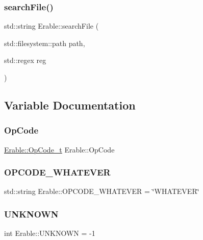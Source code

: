 \mbox{\label{namespace_erable_ab8dc07f5bbd7c2e716b38c2feaca831b}} 
\subsubsection{\texorpdfstring{searchFile()}{searchFile()}}
{\footnotesize\ttfamily std\+::string Erable\+::search\+File (\begin{DoxyParamCaption}\item[{std\+::filesystem\+::path}]{path,  }\item[{std\+::regex}]{reg }\end{DoxyParamCaption})}



\subsection{Variable Documentation}
\mbox{\label{namespace_erable_adf78214f7408cc5507bb91e4e022379c}} 
\subsubsection{\texorpdfstring{OpCode}{OpCode}}
{\footnotesize\ttfamily \mbox{\hyperlink{class_erable_1_1_op_code__t}{Erable\+::\+Op\+Code\+\_\+t}} Erable\+::\+Op\+Code\hspace{0.3cm}{\ttfamily [inline]}}

\mbox{\label{namespace_erable_a60c921f1f338c12555495547451795f3}} 
\subsubsection{\texorpdfstring{OPCODE\_WHATEVER}{OPCODE\_WHATEVER}}
{\footnotesize\ttfamily std\+::string Erable\+::\+O\+P\+C\+O\+D\+E\+\_\+\+W\+H\+A\+T\+E\+V\+ER = \char`\"{}W\+H\+A\+T\+E\+V\+ER\char`\"{}\hspace{0.3cm}{\ttfamily [inline]}}

\mbox{\label{namespace_erable_a6d9e1e498f68cd7fa1c71cb362c89333}} 
\subsubsection{\texorpdfstring{UNKNOWN}{UNKNOWN}}
{\footnotesize\ttfamily int Erable\+::\+U\+N\+K\+N\+O\+WN = -\/1\hspace{0.3cm}{\ttfamily [inline]}}

